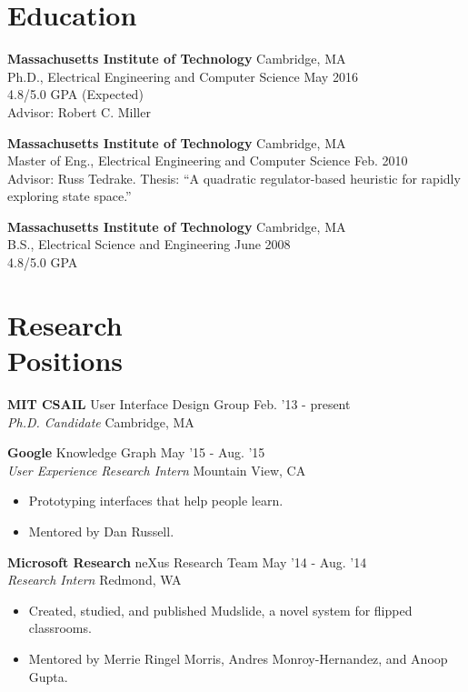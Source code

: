\documentclass[margin]{res}
\begin{document}
\begin{resume}

\section{Education} 
{\bf Massachusetts Institute of Technology} \hfill Cambridge, MA \\
Ph.D., Electrical Engineering and Computer Science \hfill May 2016\\
4.8/5.0 GPA  \hfill (Expected) \\
Advisor: Robert C. Miller 

{\bf Massachusetts Institute of Technology} \hfill Cambridge, MA \\
Master of Eng., Electrical Engineering and Computer Science \hfill Feb. 2010 \\
Advisor: Russ Tedrake. Thesis: ``A quadratic regulator-based heuristic for rapidly exploring state space.''

{\bf Massachusetts Institute of Technology} \hfill Cambridge, MA \\
B.S., Electrical Science and Engineering \hfill June 2008 \\
4.8/5.0 GPA

\section{Research \\Positions}

{\bf MIT CSAIL} User Interface Design Group \hfill Feb. '13 - present \\ 
{\it Ph.D. Candidate} \hfill Cambridge, MA 

{\bf Google} Knowledge Graph \hfill May '15 - Aug. '15 \\ {\it User Experience Research Intern} \hfill Mountain View, CA 
 \begin{itemize} \itemsep -2pt  %
 \item Prototyping interfaces that help people learn.
\item Mentored by Dan Russell. 
\end{itemize}

{\bf Microsoft Research} neXus Research Team \hfill May '14 - Aug. '14 \\ {\it Research Intern} \hfill Redmond, WA 
 \begin{itemize} \itemsep -2pt  %
 \item Created, studied, and published Mudslide, a novel system for flipped classrooms.
\item Mentored by Merrie Ringel Morris, Andres Monroy-Hernandez, and Anoop Gupta. 
\end{itemize}


\end{resume}
\end{document}
